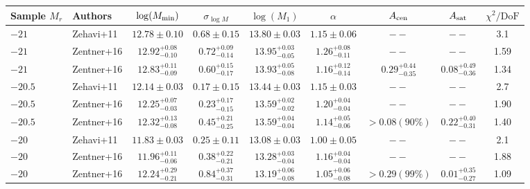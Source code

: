 \documentclass[usenatbib,usegraphicx,letterpaper]{mn2e}
\begin{document}
\begin{table}
{\renewcommand{\arraystretch}{1.3}
\renewcommand{\tabcolsep}{0.2cm}
\begin{tabular}{l l c c c c c c c}
\hline
\hline
Sample $M_r$ &  Authors & $\log (M_{\rm min})$ & $\sigma_{\log M}$ & $ \log (M_1)$ & $\alpha$ & $A_{\rm cen}$ & $A_{\rm sat}$ & $\chi^2/\mathrm{DoF}$\\
\hline
$-21$ & Zehavi+11 & $12.78 \pm 0.10$ & $0.68 \pm 0.15$ & $13.80 \pm 0.03$ & $1.15 \pm 0.06$ & $--$ & $--$ & 3.1\\
$-21$ & Zentner+16 & $12.92^{+0.08}_{-0.10}$ & $0.72^{+0.09}_{-0.14}$ & $13.95^{+0.03}_{-0.05}$ & $1.26^{+0.08}_{-0.11}$ & $--$ & $--$ & 1.59\\
$-21$ & Zentner+16 & $12.83^{+0.11}_{-0.09}$ & $0.60^{+0.15}_{-0.17}$ & $13.93^{+0.05}_{-0.08}$ & $1.16^{+0.12}_{-0.14}$ & $0.29^{+0.44}_{-0.35}$ & $0.08^{+0.49}_{-0.36}$ & 1.34 \vspace*{5pt}\\
%
$-20.5$ & Zehavi+11 & $12.14 \pm 0.03$ & $0.17 \pm 0.15$ & $13.44 \pm 0.03$ & $1.15 \pm 0.03$ & $--$ & $--$ & 2.7\\
$-20.5$ & Zentner+16 & $12.25^{+0.07}_{-0.03}$ & $0.23^{+0.17}_{-0.15}$ & $13.59^{+0.02}_{-0.02}$ & $1.20^{+0.04}_{-0.04}$ & $--$ & $--$ & 1.90\\
$-20.5$ & Zentner+16 & $12.32^{+0.13}_{-0.08}$ & $0.45^{+0.21}_{-0.25}$ & $13.59^{+0.04}_{-0.04}$ & $1.14^{+0.05}_{-0.06}$ & $>0.08 (90\%)$ & $0.22^{+0.40}_{-0.31}$ & 1.40 \vspace*{5pt}\\
%
$-20$ & Zehavi+11 & $11.83 \pm 0.03$ & $0.25 \pm 0.11$ & $13.08 \pm 0.03$ & $1.00 \pm 0.05$ & $--$ & $--$ & 2.1\\
$-20$ & Zentner+16 & $11.96^{+0.11}_{-0.06}$ & $0.38^{+0.22}_{-0.21}$ & $13.28^{+0.03}_{-0.04}$ & $1.16^{+0.04}_{-0.04}$ & $--$ & $--$ & 1.88\\
$-20$ & Zentner+16 & $12.24^{+0.29}_{-0.21}$ & $0.84^{+0.37}_{-0.31}$ & $13.19^{+0.06}_{-0.08}$ & $1.05^{+0.06}_{-0.08}$ & $ >0.29 (99\%) $ & $0.01^{+0.35}_{-0.27}$ & 1.09 \vspace*{5pt}\\

\end{tabular}}
\end{table}
\end{document}

